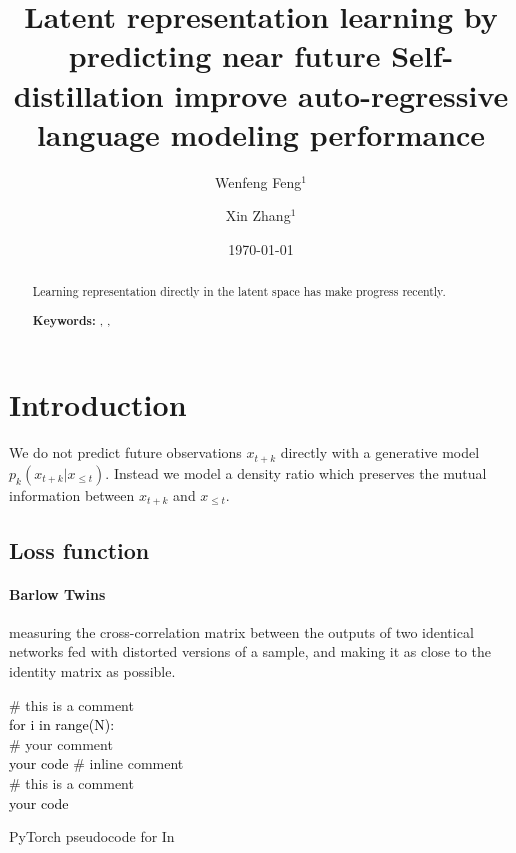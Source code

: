 \documentclass[a4paper]{article}
\title{
	Latent representation learning by predicting near future
	Self-distillation improve auto-regressive language modeling performance
	}
\author{Wenfeng Feng$^1$ \and Xin Zhang$^1$}
\date{
	\today
}
\newcommand{\PyComment}[1]{\ttfamily\textcolor{green!50!black}{\# #1}}  %
\newcommand{\PyCode}[1]{\ttfamily\textcolor{black}{#1}} %
\begin{document}
	\maketitle
	
	\begin{abstract}
		Learning representation directly in the latent space has make progress recently.
		
		\noindent\textbf{Keywords:} , , 
	\end{abstract}

	\tableofcontents
	
	\section{Introduction}
	\label{sec:intro}
	
	We do not predict future observations $x_{t+k}$ directly with a generative model $p_k(x_{t+k}|x_{\le t})$.
	Instead we model a density ratio which preserves the mutual information between $x_{t+k}$ and $x_{\le t}$.
	\cite{van2018representation}
	
	\subsection{Loss function}
	\label{subsec:loss}

	\paragraph*{Barlow Twins} \cite{zbontar2021barlow}
	measuring the cross-correlation matrix between the outputs of two identical networks fed with distorted versions of a sample,
	and making it as close to the identity matrix as possible.

	\begin{algorithm}[h]
		\SetInd{1em}{1em}
			\PyComment{this is a comment} \\
			\PyCode{for i in range(N):} \\
			\Indp   %
				\PyComment{your comment} \\
				\PyCode{your code} \PyComment{inline comment} \\ 
			\Indm %
			\PyComment{this is a comment} \\
			\PyCode{your code}
		\caption{PyTorch pseudocode for In}
		\label{algo:your-algo}
	\end{algorithm}
		
\end{document}
